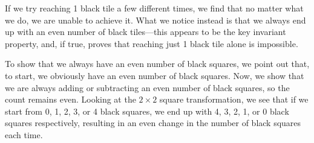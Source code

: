 \begin{solution}
    If we try reaching 1 black tile a few different times, we find that no matter what we do, we are unable to achieve it. What we notice instead is that we always end up with an even number of black tiles---this appears to be the key invariant property, and, if true, proves that reaching just 1 black tile alone is impossible. 

    To show that we always have an even number of black squares, we point out that, to start, we obviously have an even number of black squares. Now, we show that we are always adding or subtracting an even number of black squares, so the count remains even. Looking at the $2\times2$ square transformation, we see that if we start from 0, 1, 2, 3, or 4 black squares, we end up with 4, 3, 2, 1, or 0 black squares respectively, resulting in an even change in the number of black squares each time. 
    \begin{center}
    \end{center}
    

\end{solution}
